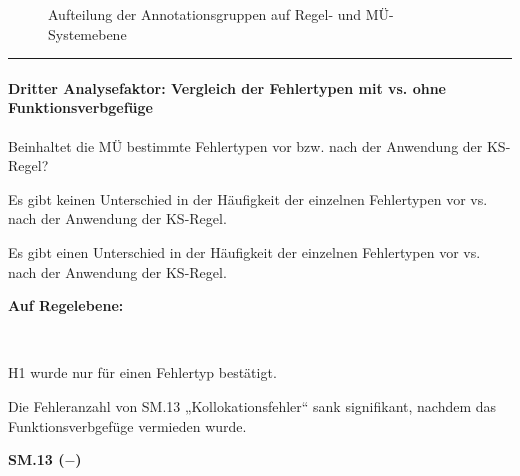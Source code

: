\begin{figure}[H]


\caption{Aufteilung der Annotationsgruppen auf Regel- und MÜ-Systemebene   }
\end{figure}
\hrule
\newpage
\paragraph*{Dritter Analysefaktor: Vergleich der Fehlertypen mit vs. ohne Funktionsverbgefüge}
\begin{description}[font=\normalfont\bfseries]
\item [Fragestellung:] Beinhaltet die MÜ bestimmte Fehlertypen vor bzw. nach der Anwendung der KS-Regel?
\item [H0 --] Es gibt keinen Unterschied in der Häufigkeit der einzelnen Fehlertypen vor vs. nach der Anwendung der KS-Regel.
\item [H1 --] Es gibt einen Unterschied in der Häufigkeit der einzelnen Fehlertypen vor vs. nach der Anwendung der KS-Regel.
\item [Resultat]
\end{description}
\noindent
\parbox[t]{.8\textwidth}{\textbf{Auf Regelebene:}}\\
\noindent
\parbox[t]{.8\textwidth}{
H1 wurde nur für einen Fehlertyp bestätigt.

Die Fehleranzahl von SM.13 „Kollokationsfehler“ sank signifikant, nachdem das Funktionsverbgefüge vermieden wurde.}
\parbox[t]{.04\textwidth}{}
\colorbox{smGreen}{\parbox[t]{.15\textwidth}{\textbf{SM.13 ($-$)}\\
\\
}}

